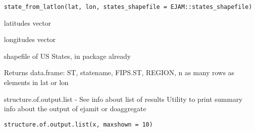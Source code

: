 \documentclass[a4paper]{book}
\begin{document}
%
\begin{Usage}
\begin{verbatim}
state_from_latlon(lat, lon, states_shapefile = EJAM::states_shapefile)
\end{verbatim}
\end{Usage}
%
\begin{Arguments}
\begin{ldescription}
\item[\code{lat}] latitudes vector

\item[\code{lon}] longitudes vector

\item[\code{shapefile}] shapefile of US States, in package already
\end{ldescription}
\end{Arguments}
%
\begin{Value}
Returns data.frame: ST, statename, FIPS.ST, REGION, n
as many rows as elements in lat or lon
\end{Value}
%
\begin{SeeAlso}\relax
{}  
\end{SeeAlso}
%
\begin{Examples}
\end{Examples}
%
\begin{Description}\relax
structure.of.output.list - See info about list of results
Utility to print summary info about the output of ejamit or doaggregate
\end{Description}
%
\begin{Usage}
\begin{verbatim}
structure.of.output.list(x, maxshown = 10)
\end{verbatim}
\end{Usage}
\end{document}
